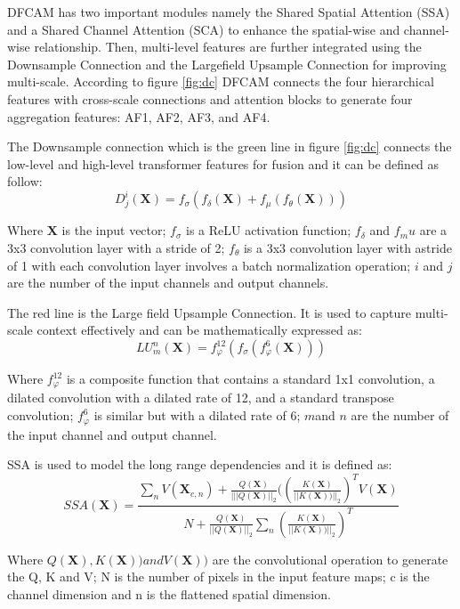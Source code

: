 DFCAM has two important modules namely the Shared Spatial Attention (SSA) and a Shared Channel Attention (SCA) to enhance the spatial-wise and channel-wise relationship. Then, multi-level features are further integrated using the Downsample Connection and the Largefield Upsample Connection for improving multi-scale. According to figure \ref{fig:dc} DFCAM connects the four hierarchical features with cross-scale connections and attention blocks to generate four aggregation features: AF1, AF2, AF3, and AF4.  

The Downsample connection which is the green line in figure \ref{fig:dc} connects the low-level and high-level transformer features for fusion and it can be defined as follow:
\begin{equation}
    D^i_j(\mathbf{X}) = f_\sigma(f_\delta(\mathbf{X}) + f_\mu(f_\theta(\mathbf{X})))
\end{equation}

Where $\mathbf{X}$ is the input vector; $f_\sigma$ is a ReLU activation function; $f_\delta$ and $f_mu$ are a 3x3 convolution layer with a stride of 2; $f_\theta$ is a 3x3 convolution layer with astride of 1 with each convolution layer involves a batch normalization operation; $i$ and $j$ are the number of the input channels and output channels.

The red line is the Large field Upsample Connection. It is used to capture multi-scale
context effectively and can be mathematically expressed as:
\begin{equation}
    LU^n_m(\mathbf{X}) = f^{12}_\varphi(f_\sigma(f^6_\varphi(\mathbf{X})))
\end{equation}

Where $f^{12}_\varphi$ is a composite function that contains a standard 1x1 convolution, a dilated convolution with a dilated rate of 12, and a standard transpose convolution; $f^{6}_\varphi$ is similar but with a dilated rate of 6; $m $and $n$ are the number of the input channel and output channel.

SSA is used to model the long range dependencies and it is defined as: 
\begin{equation}
    SSA(\mathbf{X}) = \frac{\sum_n V(\mathbf{X}_{c,n})+\frac{Q(\mathbf{X})}{|||Q(\mathbf{X})||_2} ((\frac{K(\mathbf{X})}{||K(\mathbf{X}))||_2})^T V(\mathbf{X})}
    {N + \frac{Q(\mathbf{X})}{||Q(\mathbf{X})||_2} \sum_n(\frac{K(\mathbf{X})}{||K(\mathbf{X}))||_2})^T }
\end{equation}

Where $Q(\mathbf{X}), K(\mathbf{X})) and V(\mathbf{X}))$ are the convolutional operation to generate the Q, K and V; N is the number of pixels in the input feature maps; c is the channel dimension and n is the flattened spatial dimension.

